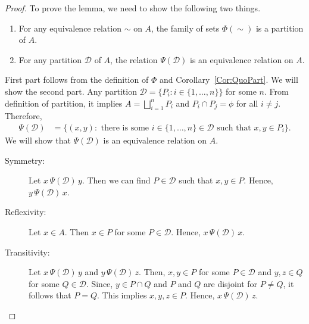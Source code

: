 \documentclass[a4paper,english,12pt]{article}
\begin{document}
\begin{proof}
	To prove the lemma, we need to show the following two things.
	\begin{enumerate}
		\item For any equivalence relation $\sim$ on $A$, the family of sets $\Phi(\sim)$ is a partition of $A$.
		\item For any partition $\mathcal{D}$ of $A$, the relation $\Psi(\mathcal{D})$ is an equivalence relation on $A$.
	\end{enumerate}
	First part follows from the definition of $\Phi$ and Corollary~\ref{Cor:QuoPart}. We will show the second part. Any partition $\mathcal{D} = \{P_i : i \in \{1, \ldots, n\}\}$ for some $n$. From definition of partition, it implies $A = \bigsqcup\limits_{i=1}^{n}P_i$ and $P_i\cap P_j = \phi$ for all $i \neq j$. Therefore, 
\begin{align*}
	\Psi (\mathcal{D}) &= \{(x,y): \text{ there is some } i \in \{1,\ldots,n\} \in \mathcal{D} \text{ such that } x,y \in P_i\}.
\end{align*}
We will show that $\Psi (\mathcal{D})$ is an equivalence relation on $A$.
\begin{description}
	\item[Symmetry:] Let $x\, \Psi(\mathcal{D})\, y$. Then we can find $P \in \mathcal{D}$ such that $x,y \in P$. Hence, $y\, \Psi(\mathcal{D})\, x$.
	\item[Reflexivity:] Let $x \in A$. Then $x \in P$ for some $P \in \mathcal{D}$. Hence, $x\, \Psi(\mathcal{D})\, x$.
	\item[Transitivity:] Let $x\, \Psi(\mathcal{D})\, y$ and $y\, \Psi(\mathcal{D})\, z$. Then, $x,y \in P$ for some $P \in \mathcal{D}$ and $y,z \in Q$ for some $Q \in \mathcal{D}$. Since, $y \in P \cap Q$ and $P$ and $Q$ are disjoint for $P \neq Q$, it follows that $P = Q$. This implies $x,y,z \in P$. Hence, $x\, \Psi(\mathcal{D})\, z$.
\end{description}
\end{proof}
\end{document}
